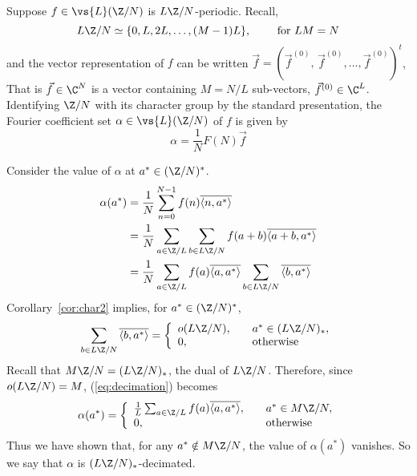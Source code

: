 \begin{example}
Suppose $f\in \vs{L}(\Z/N)$ is $L\Z/N$-periodic. Recall,
\[
L\Z/N \simeq \{0,L,2L,\ldots,(M-1)L\}, \qquad \text{ for } LM = N
\]
and the vector representation of $f$ can be written
$\vec{f} = (\vec{f}^{(0)},\,\vec{f}^{(0)},\ldots,\vec{f}^{(0)})^t$,
That is $\vec{f}\in \C^N$ is a vector containing $M = N/L$ sub-vectors,
$\vec{f}^{(0)}\in \C^L$.
Identifying $\Z/N$ with its character group by the standard presentation, the
Fourier coefficient set $\alpha \in \vs{L}(\Z/N)$ of $f$ is given by
\[
\alpha = \frac{1}{N} F(N) \vec{f}
\]

Consider the value of $\alpha$ at $a^*\in (\Z/N)^*$.
\begin{align}\label{eq:decimation}
\alpha(a^*) &= \frac{1}{N} \sum_{n=0}^{N-1}f(n)\overline{\langle n,a^*\rangle}\nonumber\\
&= \frac{1}{N} \sum_{a\in \Z/L}\sum_{b\in L\Z/N}f(a+b)\overline{\langle a+b,a^*\rangle}\nonumber\\
&= \frac{1}{N} \sum_{a\in \Z/L}f(a)\overline{\langle a,a^*\rangle}\sum_{b\in L\Z/N}\overline{\langle b,a^*\rangle}
\end{align}
Corollary~\ref{cor:char2} implies, for $a^*\in (\Z/N)^*$,
\[
\sum_{b\in L\Z/N} \overline{\langle b, a^* \rangle} = 
\left\{\begin{array}{ll}
o(L\Z/N),& \quad a^* \in (L\Z/N)_*,\\
0,& \quad \text{otherwise}
\end{array}
\right.
\]
Recall that $M\Z/N = (L\Z/N)_*$, the dual of $L\Z/N$.  
Therefore, since $o(L\Z/N) = M$, (\ref{eq:decimation}) becomes
\[
\alpha(a^*) =
\left\{\begin{array}{ll}
\frac{1}{L} \sum_{a\in \Z/L}f(a)\overline{\langle a,a^*\rangle},& \quad a^* \in M\Z/N,\\
0,& \quad \text{otherwise}
\end{array}
\right.
\]
Thus we have shown that, for any $a^* \notin M\Z/N$, the value of $\alpha(a^*)$ vanishes.
So we say that $\alpha$ is $(L\Z/N)_*$-decimated. 


\end{example}
